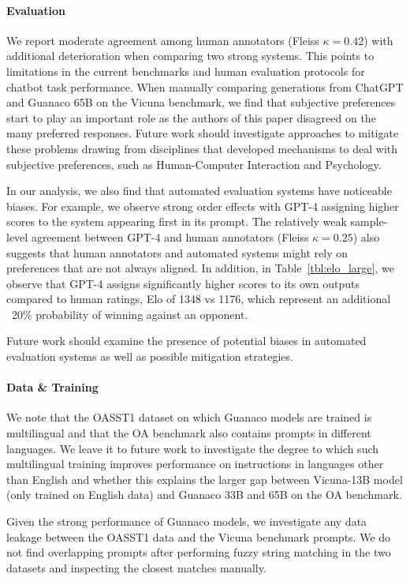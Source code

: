 \paragraph{Evaluation}

We report moderate agreement among human annotators (Fleiss $\kappa=0.42$) with additional deterioration when comparing two strong systems. This points to limitations in the current benchmarks and human evaluation protocols for chatbot task performance. When manually comparing generations from ChatGPT and {Guanaco} 65B on the Vicuna benchmark, we find that subjective preferences start to play an important role as the authors of this paper disagreed on the many preferred responses. Future work should investigate approaches to mitigate these problems drawing from disciplines that developed mechanisms to deal with subjective preferences, such as Human-Computer Interaction and Psychology.

In our analysis, we also find that automated evaluation systems have noticeable biases. For example, we observe strong order effects with GPT-4 assigning higher scores to the system appearing first in its prompt. The relatively weak sample-level agreement between GPT-4 and human annotators (Fleiss $\kappa=0.25$) also suggests that human annotators and automated systems might rely on preferences that are not always aligned. In addition, in Table~\ref{tbl:elo_large}, we observe that GPT-4 assigns significantly higher scores to its own outputs compared to human ratings, Elo of 1348 vs 1176, which represent an additional ~20\% probability of winning against an opponent. 

Future work should examine the presence of potential biases in automated evaluation systems as well as possible mitigation strategies.

\paragraph{Data \& Training} We note that the OASST1 dataset  on which {Guanaco} models are trained is multilingual and that the OA benchmark also contains prompts in different languages. We leave it to future work to investigate the degree to which such multilingual training improves performance on instructions in languages other than English and whether this explains the larger gap between Vicuna-13B model (only trained on English data) and {Guanaco} 33B and 65B on the OA benchmark.

Given the strong performance of {Guanaco} models, we investigate any data leakage between the OASST1 data and the Vicuna benchmark prompts. We do not find overlapping prompts after performing fuzzy string matching in the two datasets and inspecting the closest matches manually.

